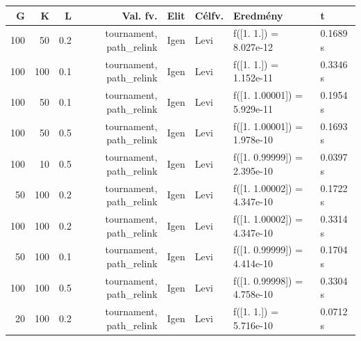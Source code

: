 \begin{tabular}{rrrrllll}
G & K & L & Val. fv. & Elit & Célfv. & Eredmény & t \\
\hline
100 & 50 & 0.2 & tournament, path\_relink & Igen & Levi & f([1. 1.]) = 8.027e-12 & 0.1689 s \\
100 & 100 & 0.1 & tournament, path\_relink & Igen & Levi & f([1. 1.]) = 1.152e-11 & 0.3346 s \\
100 & 50 & 0.1 & tournament, path\_relink & Igen & Levi & f([1.      1.00001]) = 5.929e-11 & 0.1954 s \\
100 & 50 & 0.5 & tournament, path\_relink & Igen & Levi & f([1.      1.00001]) = 1.978e-10 & 0.1693 s \\
100 & 10 & 0.5 & tournament, path\_relink & Igen & Levi & f([1.      0.99999]) = 2.395e-10 & 0.0397 s \\
50 & 100 & 0.2 & tournament, path\_relink & Igen & Levi & f([1.      1.00002]) = 4.347e-10 & 0.1722 s \\
100 & 100 & 0.2 & tournament, path\_relink & Igen & Levi & f([1.      1.00002]) = 4.347e-10 & 0.3314 s \\
50 & 100 & 0.1 & tournament, path\_relink & Igen & Levi & f([1.      0.99999]) = 4.414e-10 & 0.1704 s \\
100 & 100 & 0.5 & tournament, path\_relink & Igen & Levi & f([1.      0.99998]) = 4.758e-10 & 0.3304 s \\
20 & 100 & 0.2 & tournament, path\_relink & Igen & Levi & f([1. 1.]) = 5.716e-10 & 0.0712 s \\
\end{tabular}
